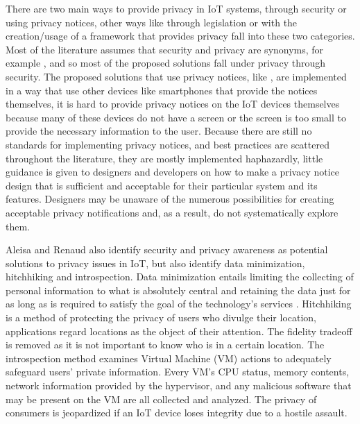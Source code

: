 There are two main ways to provide privacy in IoT systems, through security
or using privacy notices, other ways like through legislation or with the
creation/usage of a framework that provides privacy fall into these two
categories. Most of the literature assumes that security and privacy are
synonyms, for example \cite{opara2022framework, FabianoInternet, SunSecure},
and so most of the proposed solutions fall under privacy through security.
The proposed solutions that use privacy notices, like \cite{FengDesign},
are implemented in a way that use other devices like smartphones that provide
the notices themselves, it is hard to provide privacy notices on the IoT
devices themselves because many of these devices do not have a screen or
the screen is too small to provide the necessary information to the user.
Because there are still no standards for implementing privacy notices, and
best practices are scattered throughout the literature, they are mostly
implemented haphazardly, little guidance is given to designers and developers
on how to make a privacy notice design that is sufficient and acceptable
for their particular system and its features. Designers may be unaware of
the numerous possibilities for creating acceptable privacy notifications
and, as a result, do not systematically explore them.

Aleisa and Renaud \cite{aleisa2016privacy} also identify security and privacy
awareness as potential solutions to privacy issues in IoT, but also identify
data minimization, hitchhiking and introspection. Data minimization entails
limiting the collecting of personal information to what is absolutely central
and retaining the data just for as long as is required to satisfy the goal
of the technology's services \cite{ojDirective281}. Hitchhiking \cite{tang2006putting}
is a method of protecting the privacy of users who divulge their location,
applications regard locations as the object of their attention. The fidelity
tradeoff is removed as it is not important to know who is in a certain
location. The introspection \cite{kang2015protection} method examines Virtual
Machine (VM) actions to adequately safeguard users' private information.
Every VM's CPU status, memory contents, network information provided by the
hypervisor, and any malicious software that may be present on the VM are
all collected and analyzed. The privacy of consumers is jeopardized if
an IoT device loses integrity due to a hostile assault.

